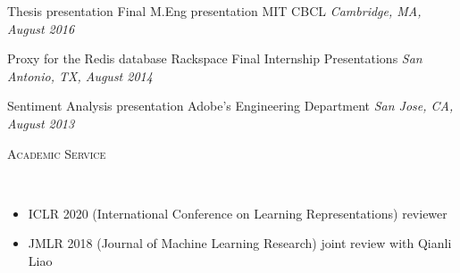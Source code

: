 \documentclass{article}
\newenvironment{changemargin}[2]{%
  \begin{list}{}{%
    \setlength{\topsep}{0pt}%
    \setlength{\leftmargin}{#1}%
    \setlength{\rightmargin}{#2}%
    \setlength{\listparindent}{\parindent}%
    \setlength{\itemindent}{\parindent}%
    \setlength{\parsep}{\parskip}%
  }%
  \item[]}{\end{list}
}
\newcommand{\lineover}{
	\begin{changemargin}{-0.05in}{-0.05in}
		\vspace*{-8pt}
		\hrulefill \\
		\vspace*{-2pt}
	\end{changemargin}
}
\newcommand{\header}[1]{
	\begin{changemargin}{-0.5in}{-0.5in}
		\scshape{#1}\\
  	\lineover
	\end{changemargin}
}
\newenvironment{body} {
	\vspace*{-16pt}
	\begin{changemargin}{-0.25in}{-0.5in}
  }	
	{\end{changemargin}
}
\begin{document}
\begin{body}
	
	\vspace{5 pt}
    Thesis presentation
    \hfill
    Final M.Eng presentation MIT CBCL
	\hfill %
	\emph{Cambridge, MA, August 2016}\\
	\vspace*{-3pt}
	
	\vspace{5 pt}
    Proxy for the Redis database
    \hfill
    Rackspace Final Internship Presentations
	\hfill %
	\emph{San Antonio, TX, August 2014}\\
	\vspace*{-3pt}

	\vspace{5 pt}
    Sentiment Analysis presentation
    \hfill
    Adobe’s Engineering Department
	\hfill %
	\emph{San Jose, CA, August 2013}\\
	\vspace*{-3pt}
    
    
\end{body}

\newpage


\header{Academic Service}

\begin{body}

\vspace{16pt}
\begin{itemize}
    \item ICLR 2020 (International Conference on Learning Representations) reviewer
    \item JMLR 2018 (Journal of Machine Learning Research) joint review with Qianli Liao
\end{itemize}

\end{body}
\end{document}
